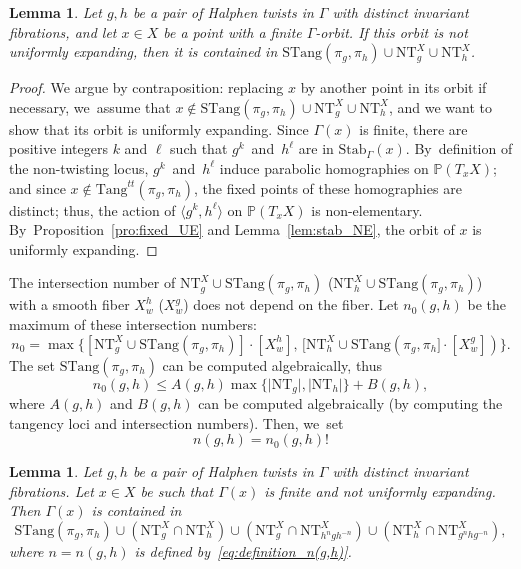 \documentclass[JEP,XML,SOM,Unicode,published]{cedram}
\newcommand{\bset}[1]{\bigl\{#1\bigr\}}
\newcommand{\pp}{\mathbb{P}}\let\P\pp
\newcommand{\Tang}{{\mathrm{Tang}}}
\newcommand{\STang}{{\mathrm{STang}}}
\newcommand{\NT}{{\mathrm{NT}}}
\theoremstyle{plain}
\newtheorem{lem}[thm]{Lemma}
\theoremstyle{definition}
\begin{document}
\begin{lem}\label{lem:NT1}
Let $g,h$ be a pair of Halphen twists in $\Gamma$ with distinct invariant fibrations, and let $x\in X$ be a point with a finite $\Gamma$-orbit.
If this orbit is not uniformly expanding, then
it is contained in
$ \STang(\pi_g, \pi_h)\cup \NT_g^X\cup \NT_h^X$.
\end{lem}

\begin{proof}
We argue by contraposition: replacing $x$ by another point in its orbit if necessary, we~assume that $x\notin \STang(\pi_g, \pi_h)\cup \NT_g^X\cup \NT_h^X$, and we want to show that its orbit is
uniformly expanding.
Since $\Gamma(x)$ is finite, there are positive integers $k$ and $\ell$
such that $g^k$~and~$h^\ell$ are in $\mathrm{Stab}_\Gamma(x)$. By~definition of the non-twisting locus,
$g^k$~and~$h^\ell$
induce parabolic homographies on $\pp(T_xX)$; and since $x\notin \Tang^{tt}(\pi_g,\pi_h)$, the
fixed points of these homographies are distinct; thus, the action of
$\langle g^k, h^\ell\rangle$ on $\pp(T_xX)$ is non-elementary. By~Proposition~\ref{pro:fixed_UE} and Lemma~\ref{lem:stab_NE}, the orbit of $x$ is uniformly expanding. \end{proof}

The intersection number of $\NT_g^X \cup \STang(\pi_g, \pi_h)$ (\resp $\NT_h^X \cup \STang(\pi_g, \pi_h)$) with a smooth fiber $X_w^h$ (\resp $X_w^g$) does not depend on the fiber. Let $n_0(g,h)$ be the maximum of these intersection numbers:
\begin{equation}\label{eq:definition_n0}
n_0=\max\bset{[\NT_g^X \cup \STang(\pi_g, \pi_h)] \cdot [X_w^h],\,  [\NT_h^X \cup \STang(\pi_g, \pi_h]\cdot [X_w^g])}.
\end{equation}
The set $\STang(\pi_g, \pi_h)$ can be computed algebraically, thus
\begin{equation*}
n_0(g,h)\leq A(g,h) \max\bset{\vert \NT_g\vert, \vert \NT_h\vert} + B(g,h),
\end{equation*}
where $A(g,h)$ and $B(g,h)$ can be computed algebraically (by computing the tangency loci and intersection numbers).
Then, we~set
\begin{equation}\label{eq:definition_n(g,h)}
n(g,h)=n_0(g,h) !
\end{equation}

\begin{lem}\label{lem:definition_of_bad(g,h)}
Let $g,h$ be a pair of Halphen twists in $\Gamma$ with distinct invariant fibrations. Let
$x\in X$ be such that $\Gamma(x)$ is finite and not
uniformly expanding. Then $\Gamma(x)$ is contained in
\[
\STang(\pi_g, \pi_h) \cup
(\NT_g^X\cap \NT_h^X)\cup (\NT_g^X\cap \NT_{h^n gh^{-n}}^X) \cup (\NT_h^X\cap \NT_{g^nhg^{-n}}^X),
\]
where $n=n(g,h)$ is defined by~\eqref{eq:definition_n(g,h)}.
\end{lem}
\end{document}
